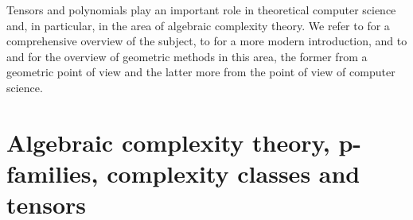 Tensors and polynomials play an important role in theoretical computer science and, in particular, in the area of algebraic complexity theory. We refer to \cite{BCS97} for a comprehensive overview of the subject, to \cite{Sap21} for a more modern introduction, and to \cite{Lan17} and \cite{BI18} for the overview of geometric methods in this area, the former from a geometric point of view and the latter more from the point of view of computer science.


\chapter{Algebraic complexity theory, p-families, complexity classes and tensors}
\label{complexitytheory-chapter-ACTintro}

